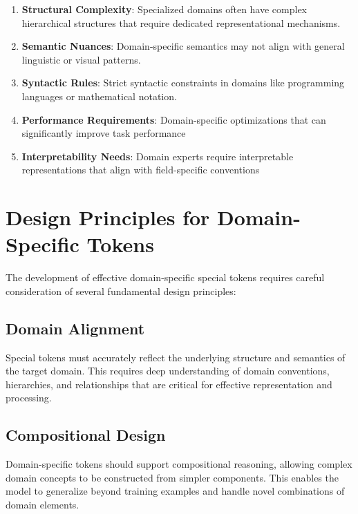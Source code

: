 \begin{enumerate}
\item \textbf{Structural Complexity}: Specialized domains often have complex hierarchical structures that require dedicated representational mechanisms.
\item \textbf{Semantic Nuances}: Domain-specific semantics may not align with general linguistic or visual patterns.
\item \textbf{Syntactic Rules}: Strict syntactic constraints in domains like programming languages or mathematical notation.
\item \textbf{Performance Requirements}: Domain-specific optimizations that can significantly improve task performance
\item \textbf{Interpretability Needs}: Domain experts require interpretable representations that align with field-specific conventions
\end{enumerate}
\begin{comment}
Examples for the above challenges:
- Structural Complexity: "A generic [SEP] token cannot distinguish between the end of a line of code, the end of a function, and the end of a class, yet these are fundamentally different structural boundaries."
- Syntactic Rules: "In mathematics, the position of a token relative to a parenthesis or an integral sign completely changes its meaning in a way that has no parallel in natural language."
\end{comment}

\section{Design Principles for Domain-Specific Tokens}

The development of effective domain-specific special tokens requires careful consideration of several fundamental design principles:

\subsection{Domain Alignment}
Special tokens must accurately reflect the underlying structure and semantics of the target domain. This requires deep understanding of domain conventions, hierarchies, and relationships that are critical for effective representation and processing.

\subsection{Compositional Design}
Domain-specific tokens should support compositional reasoning, allowing complex domain concepts to be constructed from simpler components. This enables the model to generalize beyond training examples and handle novel combinations of domain elements.

